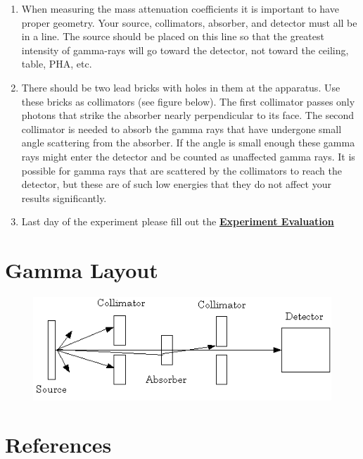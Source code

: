 \documentclass{../lab}
\begin{document}
\begin{enumerate}
\begin{enumerate}
        \item When measuring the mass attenuation coefficients it is important to have proper geometry. Your source, collimators, absorber, and detector must all be in a line. The source should be placed on this line so that the greatest intensity of gamma-rays will go toward the detector, not toward the ceiling, table, PHA, etc.

        \item There should be two lead bricks with holes in them at the apparatus. Use these bricks as collimators (see figure below). The first collimator passes only photons that strike the absorber nearly perpendicular to its face. The second collimator is needed to absorb the gamma rays that have undergone small angle scattering from the absorber. If the angle is small enough these gamma rays might enter the detector and be counted as unaffected gamma rays. It is possible for gamma rays that are scattered by the collimators to reach the detector, but these are of such low energies that they do not affect your results significantly.

        \item Last day of the experiment please fill out the \href{\ExperimentEvaluation}{\textbf{Experiment Evaluation}}

    \end{enumerate}

\end{enumerate}

\section{Gamma Layout}

\begin{figure}[h]
    \centering
    \href{http://experimentationlab.berkeley.edu/sites/default/files/images/GMAimage008.gif}{\includegraphics[width=0.5\linewidth]{images/GMAimage008.png}}
    \label{fig:GMAimage008}
\end{figure}

\section{References}
\label{sec:References}
\end{document}
